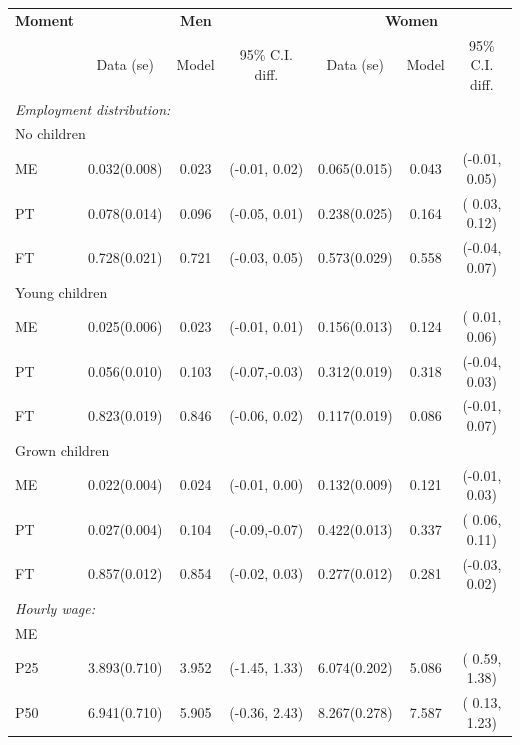  \begin{tabular}{lcccccc} \hline \hline
	\textbf{Moment}   & \multicolumn{3}{c}{\textbf{Men}} & \multicolumn{3}{c}{\textbf{Women}} \\ 
	&  Data (se) & Model & 95\% C.I. diff. &  Data (se) & Model & 95\% C.I. diff. \\ 
	\hline  
  \multicolumn{7}{l}{\textit{Employment distribution:}}   \\ 
\multicolumn{7}{l}{No children} \\ 
ME &        0.032\quad (0.008) &        0.023& (-0.01, 0.02) &        0.065\quad (0.015) &        0.043& (-0.01, 0.05) \\
PT &        0.078\quad (0.014) &        0.096& (-0.05, 0.01) &        0.238\quad (0.025) &        0.164& ( 0.03, 0.12) \\
FT &        0.728\quad (0.021) &        0.721& (-0.03, 0.05) &        0.573\quad (0.029) &        0.558& (-0.04, 0.07) \\
\multicolumn{7}{l}{Young children} \\ 
ME &        0.025\quad (0.006) &        0.023& (-0.01, 0.01) &        0.156\quad (0.013) &        0.124& ( 0.01, 0.06) \\
PT &        0.056\quad (0.010) &        0.103& (-0.07,-0.03) &        0.312\quad (0.019) &        0.318& (-0.04, 0.03) \\
FT &        0.823\quad (0.019) &        0.846& (-0.06, 0.02) &        0.117\quad (0.019) &        0.086& (-0.01, 0.07) \\
\multicolumn{7}{l}{Grown children} \\ 
ME &        0.022\quad (0.004) &        0.024& (-0.01, 0.00) &        0.132\quad (0.009) &        0.121& (-0.01, 0.03) \\
PT &        0.027\quad (0.004) &        0.104& (-0.09,-0.07) &        0.422\quad (0.013) &        0.337& ( 0.06, 0.11) \\
FT &        0.857\quad (0.012) &        0.854& (-0.02, 0.03) &        0.277\quad (0.012) &        0.281& (-0.03, 0.02) \\
\multicolumn{7}{l}{\textit{Hourly wage:}}   \\ 
\multicolumn{7}{l}{ME}   \\ 
P25 &        3.893\quad (0.710) &        3.952& (-1.45, 1.33) &        6.074\quad (0.202) &        5.086& ( 0.59, 1.38) \\
P50 &        6.941\quad (0.710) &        5.905& (-0.36, 2.43) &        8.267\quad (0.278) &        7.587& ( 0.13, 1.23) \\

\end{tabular}
